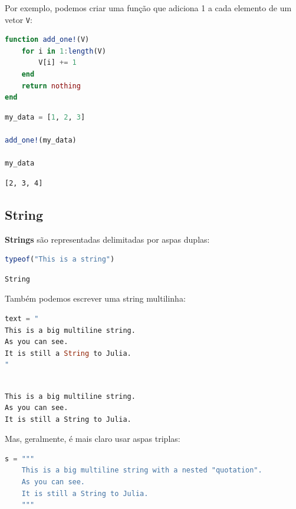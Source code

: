 \documentclass[
  notoc %
]{tufte-book}
\newcommand{\passthrough}[1]{#1}
\begin{document}
Por exemplo, podemos criar uma função que adiciona 1 a cada elemento de
um vetor \passthrough{\lstinline!V!}:

\begin{lstlisting}[language=Julia]
function add_one!(V)
    for i in 1:length(V)
        V[i] += 1
    end
    return nothing
end
\end{lstlisting}

\begin{lstlisting}[language=Julia]
my_data = [1, 2, 3]

add_one!(my_data)

my_data
\end{lstlisting}

\begin{lstlisting}[language=Output]
[2, 3, 4]
\end{lstlisting}

\hypertarget{sec:string}{%
\subsection{String}\label{sec:string}}

\textbf{Strings} são representadas delimitadas por aspas duplas:

\begin{lstlisting}[language=Julia]
typeof("This is a string")
\end{lstlisting}

\begin{lstlisting}[language=Output]
String
\end{lstlisting}

Também podemos escrever uma string multilinha:

\begin{lstlisting}[language=Julia]
text = "
This is a big multiline string.
As you can see.
It is still a String to Julia.
"
\end{lstlisting}

\begin{lstlisting}[language=Output]

This is a big multiline string.
As you can see.
It is still a String to Julia.

\end{lstlisting}

Mas, geralmente, é mais claro usar aspas triplas:

\begin{lstlisting}[language=Julia]
s = """
    This is a big multiline string with a nested "quotation".
    As you can see.
    It is still a String to Julia.
    """
\end{lstlisting}
\end{document}
